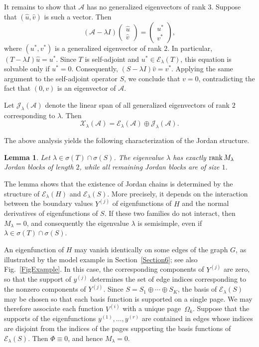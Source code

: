 \documentclass[reqno]{amsart}
\newtheorem{lem}{Lemma}
\theoremstyle{definition}
\theoremstyle{remark}
\numberwithin{equation}{section}
\newcommand{\rank}{\mathop{\rm rank}}
\newcommand{\cA}{\mathcal{A}}
\newcommand{\cE}{\mathcal{E}}
\newcommand{\cJ}{\mathcal{J}}
\newcommand{\cX}{\mathcal{X}}
\begin{document}
It remains to show that $\cA$ has no generalized eigenvectors of rank $3$.
Suppose that $(\hat{u},\hat{v})$ is such a vector. Then
\begin{equation*}
(\cA-\lambda I)\begin{pmatrix}\hat{u}\\ \hat{v}\end{pmatrix}
=\begin{pmatrix}u^*\\ v^*\end{pmatrix},
\end{equation*}
where $(u^*,v^*)$ is a generalized eigenvector of rank $2$. In particular, $(T-\lambda I)\hat{u}=u^*$. Since $T$ is self-adjoint and $u^*\in\cE_\lambda(T)$, this equation is solvable only if $u^*=0$. Consequently, $(S-\lambda I)\hat{v}=v^*$. Applying the same argument to the self-adjoint ope\-rator $S$, we conclude that $v=0$, contradicting the fact that $(0,v)$ is an eigenvector of $\cA$.

Let $\cJ_\lambda(\cA)$ denote the linear span of all generalized eigenvectors of rank $2$ corresponding to $\lambda$. Then
\begin{equation*}
\cX_\lambda(\cA)=\cE_\lambda(\cA)\oplus\cJ_\lambda(\cA).
\end{equation*}

The above analysis yields the following characterization of the Jordan structure.
\begin{lem}
Let $\lambda\in\sigma(T)\cap\sigma(S)$. The eigenvalue $\lambda$ has exactly $\rank M_\lambda$ Jordan blocks of length $2$, while all remaining Jordan blocks are of size $1$.
\end{lem}



The  lemma shows that the existence of Jordan chains is determined by the structure of $\cE_\lambda(H)$ and $\cE_\lambda(S)$. More precisely, it depends on the interaction between the boundary values $Y^{(j)}$ of eigenfunctions of $H$ and the normal derivatives of  eigenfunctions of $S$. If these two families do not interact, then $M_\lambda=0$, and consequently the eigenvalue $\lambda$ is semisimple, even if $\lambda\in\sigma(T)\cap\sigma(S)$.

An eigenfunction of $H$ may vanish identically on some edges of the graph $G$, as illustrated by the model example in Section~\ref{Section6}; see also Fig.~\ref{FigExample}. In this case, the corresponding components of $Y^{(j)}$ are zero, so that the support of $y^{(j)}$ determines the set of edge indices corresponding to the nonzero components of $Y^{(j)}$. Since $S=S_1\oplus\cdots\oplus S_K$,
the basis of $\cE_\lambda(S)$ may be chosen so that each basis function is supported on a single page. We may therefore associate each  function $V^{(i)}$ with a unique page~$\Omega_k$. Suppose that the supports of the eigenfunctions $y^{(1)},\dots,y^{(r)}$ are contained in edges whose indices are disjoint from the indices of the pages supporting the basis functions of $\cE_\lambda(S)$. Then $\Phi\equiv0$, and hence $M_\lambda=0$.
\end{document}
